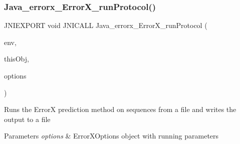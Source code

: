 \subsubsection{\texorpdfstring{Java\+\_\+errorx\+\_\+\+Error\+X\+\_\+run\+Protocol()}{Java\_errorx\_ErrorX\_runProtocol()}}
{\footnotesize\ttfamily J\+N\+I\+E\+X\+P\+O\+RT void J\+N\+I\+C\+A\+LL Java\+\_\+errorx\+\_\+\+Error\+X\+\_\+run\+Protocol (\begin{DoxyParamCaption}\item[{J\+N\+I\+Env $\ast$}]{env,  }\item[{jobject}]{this\+Obj,  }\item[{jobject}]{options }\end{DoxyParamCaption})}

Runs the ErrorX prediction method on sequences from a file and writes the output to a file


\begin{DoxyParams}{Parameters}
{\em options} & Error\+X\+Options object with running parameters \\
\hline
\end{DoxyParams}
